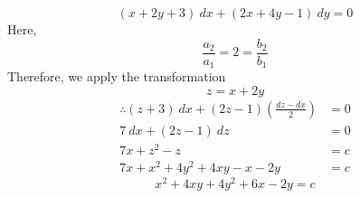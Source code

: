 \begin{example}{\[
        (x+2y+3) \: d{x} + (2x+4y-1) \: d{y} = 0
\]}{}
    Here, \[
        \frac{a_2}{a_1} = 2 = \frac{b_2}{b_1}
    \] Therefore, we apply the transformation \[
        z = x + 2y
    \]
    \begin{align*}
        \therefore (z+3) \: dx + (2z-1) \left( \frac{dz-dx}{2} \right) &= 0 \\
        7 \: dx + (2z-1) \: dz &= 0 \\
        7x + z^2 - z &= c \\
        7x + x^2 + 4y^2 + 4xy - x - 2y &= c
    \end{align*}
    \[ \boxed{ x^2 + 4xy + 4y^2 + 6x - 2y = c  } \]
\end{example}













